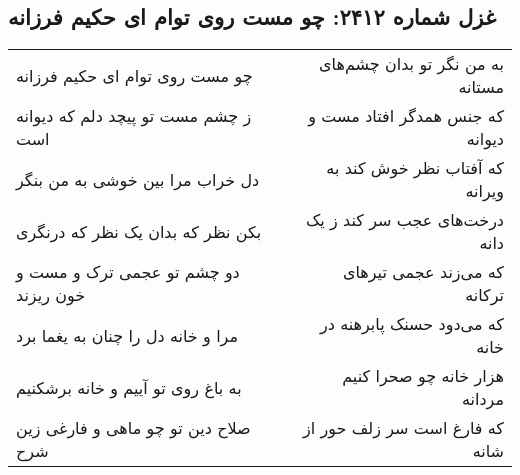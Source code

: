 \begin{center}
\section*{غزل شماره ۲۴۱۲: چو مست روی توام ای حکیم فرزانه}
\label{sec:2412}
\begin{longtable}{l p{0.5cm} r}
چو مست روی توام ای حکیم فرزانه
&&
به من نگر تو بدان چشم‌های مستانه
\\
ز چشم مست تو پیچد دلم که دیوانه است
&&
که جنس همدگر افتاد مست و دیوانه
\\
دل خراب مرا بین خوشی به من بنگر
&&
که آفتاب نظر خوش کند به ویرانه
\\
بکن نظر که بدان یک نظر که درنگری
&&
درخت‌های عجب سر کند ز یک دانه
\\
دو چشم تو عجمی ترک و مست و خون ریزند
&&
که می‌زند عجمی تیرهای ترکانه
\\
مرا و خانه دل را چنان به یغما برد
&&
که می‌دود حسنک پابرهنه در خانه
\\
به باغ روی تو آییم و خانه برشکنیم
&&
هزار خانه چو صحرا کنیم مردانه
\\
صلاح دین تو چو ماهی و فارغی زین شرح
&&
که فارغ است سر زلف حور از شانه
\\
\end{longtable}
\end{center}
